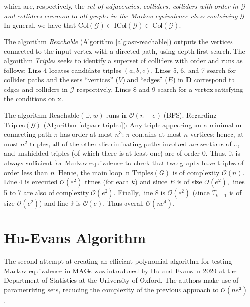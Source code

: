 \documentclass[a4paper]{article}
\begin{document}
which are, respectively, the \textit{set of adjacencies, colliders, colliders with order in $\mathcal{G}$ and colliders common to all graphs in the Markov equivalence class containing} $\mathcal{G}$. In general, we have that $\text{Col}(\mathcal{G}) \subset \text{ICol}(\mathcal{G}) \subset \text{Col}(\mathcal{G})$. 

The algorithm \textit{Reachable} (Algorithm \ref{alg:asr-reachable}) outputs the vertices connected to the input vertex with a directed path, using depth-first search. The algorithm \textit{Triples} seeks to identify a superset of colliders with order and runs as follows: Line 4 locates candidate triples $(a, b, c)$. Lines 5, 6, and 7 search for collider paths and the sets “vertices” ($V$) and “edges” ($E$) in $\mathbf{D}$ correspond to edges and colliders in $\mathcal{G}$ respectively. Lines 8 and 9 search for a vertex satisfying the conditions on x.

The algorithm $\text{Reachable}(\mathbb{D},w)$ runs in $\mathcal{O}(n+e)$ (BFS). Regarding $\text{Triples}(\mathcal{G})$ (Algorithm \ref{alg:asr-triples}): Any triple appearing on a minimal m-connecting path $\pi$ has order at most $n^3$: $\pi$ contains at most $n$ vertices; hence, at most $n^2$ triples; all of the other discriminating paths involved are sections of $\pi$; and unshielded triples (of which there is at least one) are of order $0$. Thus, it is always sufficient for Markov equivalence to check that two graphs have triples of order less than $n$. Hence, the main loop in $\text{Triples}(G)$ is of complexity $\mathcal{O}(n)$. Line 4 is executed $\mathcal{O}(e^2)$ times (for each $k$) and since $E$ is of size $\mathcal{O}(e^2)$, lines 5 to 7 are also of complexity $\mathcal{O}(e^2)$. Finally, line 8 is $\mathcal{O}(e^2)$ (since $T_{k-1}$ is of size $\mathcal{O}(e^2)$) and line 9 is $\mathcal{O}(e)$. Thus overall $\mathcal{O}(ne^4)$.

	 
\section{Hu-Evans \cite{hu2020} Algorithm}

The second attempt at creating an efficient polynomial algorithm for testing Markov equivalence in MAGs was introduced by Hu and Evans \cite{hu2020} in 2020 at the Department of Statistics at the University of Oxford. The authors make use of parametrizing sets, reducing the complexity of the previous approach to $\mathcal{O}(ne^2)$. 
\end{document}
